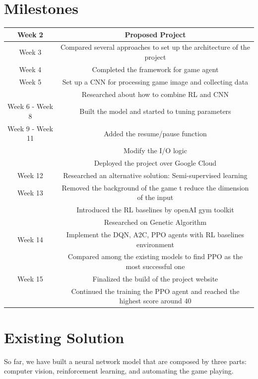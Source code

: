 \documentclass{article}
\begin{document}
\section{Milestones}
\begin{center}
\begin{tabular}{ | c | c |} 
\hline
Week 2 & Proposed Project \\ 
\hline
Week 3 & Compared several approaches to set up the architecture of the project\\ 
\hline
Week 4 & Completed the framework for game agent\\ 
\hline
Week 5 & Set up a CNN for processing game image and collecting data\\ & Researched about how to combine RL and CNN \\ 
\hline
Week 6 - Week 8 & Built the model and started to tuning parameters \\ 
\hline
Week 9 - Week 11 & Added the resume/pause function \\ 
& Modify the I/O logic\\
& Deployed the project over Google Cloud \\
\hline
Week 12 & Researched an alternative solution: Semi-supervised learning \\
\hline
Week 13 & Removed the background of the game t reduce the dimension of the input \\
& Introduced the RL baselines by openAI gym toolkit \\
& Researched on Genetic Algorithm \\
\hline
Week 14 & Implement the DQN, A2C, PPO agents with RL baselines environment \\
& Compared among the existing models to find PPO as the most successful one\\
\hline 
Week 15 & Finalized the build of the project website\\
& Continued the training the PPO agent and reached the highest score around 40 \\
\hline
\end{tabular}
\end{center}

\section{Existing Solution}
So far, we have built a neural network model that are composed by three parts: computer vision, reinforcement learning, and automating the game playing. 
\end{document}
